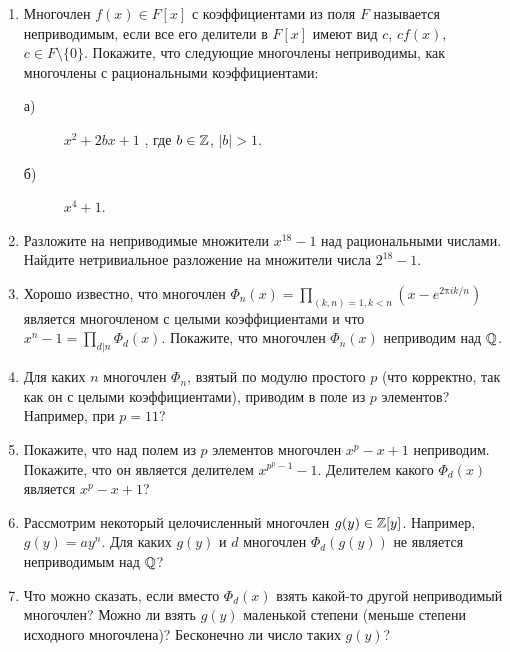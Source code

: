 \begin{enumerate}
\item Многочлен $f(x)\in F[x]$ с коэффициентами из поля $F$ называется неприводимым, если все его делители в $F[x]$ имеют вид $c$, $cf(x)$, $c\in F\setminus\{0\}$. 
Покажите, что следующие многочлены неприводимы, как многочлены с рациональными коэффициентами:
\begin{description}
\item[а)] $x^2+2bx +1$ , где $b\in\mathbb{Z}$, $|b|>1$.
\item[б)] $x^4+1$.
\end{description}
\item Разложите на неприводимые множители $x^{18}-1$ над рациональными числами. Найдите нетривиальное разложение на множители числа $2^{18}-1$.
\item Хорошо известно, что многочлен $\Phi_n(x)=\prod_{(k,n)=1, k<n} (x-e^{2\text{π} i k/n})$ является многочленом с целыми коэффициентами и что $x^n-1=\prod_{d|n}\Phi_d(x)$. Покажите, что многочлен $\Phi_n(x)$ неприводим над $\mathbb{Q}$.
\item Для каких $n$ многочлен $\Phi_n$, взятый по модулю простого $p$ (что корректно, так как он с целыми коэффициентами), приводим в поле из $p$ элементов? Например, при $p=11$?
\item Покажите, что над полем из $p$ элементов многочлен $x^p-x+1$ неприводим. Покажите, что он является делителем $x^{p^p-1}-1$. Делителем какого $\Phi_d(x)$ является $x^p-x+1$?
\item Рассмотрим некоторый целочисленный многочлен $g(y)\in\mathbb{Z}[y]$. Например, $g(y)=ay^n$. Для каких $g(y)$ и $d$ многочлен $\Phi_d(g(y))$ не является неприводимым над $\mathbb{Q}$?
\item Что можно сказать, если вместо $\Phi_d(x)$ взять какой-то другой неприводимый многочлен? Можно ли взять $g(y)$ маленькой степени (меньше степени исходного многочлена)? Бесконечно ли число таких $g(y)$?
\end{enumerate}

